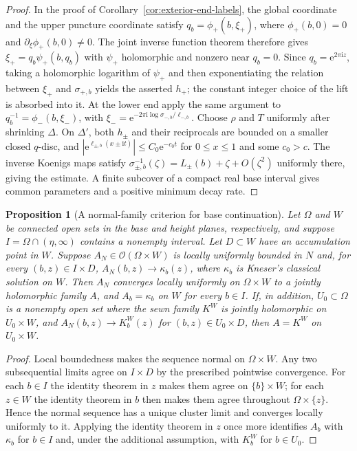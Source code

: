 \documentclass[11pt]{amsart}
\newtheorem{proposition}[theorem]{Proposition}
\theoremstyle{definition}
\newcommand{\Kk}{K}
\newcommand{\eee}{\mathrm{e}}
\newcommand{\ii}{\mathrm{i}}
\begin{document}
\begin{proof}
In the proof of Corollary~\ref{cor:exterior-end-labels}, the global
coordinate and the upper puncture coordinate satisfy
$q_b=\phi_+(b,\xi_+)$, where $\phi_+(b,0)=0$ and
$\partial_{\xi}\phi_+(b,0)\ne0$.  The joint inverse function theorem
therefore gives $\xi_+=q_b\psi_+(b,q_b)$ with $\psi_+$ holomorphic and
nonzero near $q_b=0$.  Since $q_b=\eee^{2\pi\ii z}$, taking a
holomorphic logarithm of $\psi_+$ and then exponentiating the relation
between $\xi_+$ and $\sigma_{+,b}$ yields the asserted $h_+$; the
constant integer choice of the lift is absorbed into it.  At the
lower end apply the same argument to
$q_b^{-1}=\phi_-(b,\xi_-)$, with
$\xi_-=\eee^{-2\pi\ii\log\sigma_{-,b}/\ell_{-,b}}$.
Choose $\rho$ and $T$ uniformly after shrinking $\Delta$.  On
$\Delta'$, both $h_\pm$ and their reciprocals are bounded on a
smaller closed $q$-disc, and
$|\eee^{\ell_{\pm,b}(x\pm\ii t)}|\le C_0\eee^{-c_0t}$
for $0\le x\le1$ and some $c_0>c$.  The inverse Koenigs maps satisfy
$\sigma_{\pm,b}^{-1}(\zeta)=L_\pm(b)+\zeta+O(\zeta^2)$ uniformly
there, giving the estimate.  A finite subcover of a compact real base
interval gives common parameters and a positive minimum decay rate.
\end{proof}

\begin{proposition}[A normal-family criterion for base continuation]
\label{prop:approx-continuation}
Let $\Omega$ and $W$ be connected open sets in the base and height planes,
respectively, and suppose $I=\Omega\cap(\eta,\infty)$ contains a nonempty
interval.  Let $D\subset W$ have an accumulation point in $W$.
Suppose $A_N\in\mathcal O(\Omega\times W)$ is locally uniformly bounded
in $N$ and, for every $(b,z)\in I\times D$,
$A_N(b,z)\to\kappa_b(z)$, where $\kappa_b$ is Kneser's classical solution
on $W$.  Then $A_N$ converges locally uniformly on $\Omega\times W$
to a jointly holomorphic family $A$, and $A_b=\kappa_b$ on $W$ for every
$b\in I$.  If, in addition, $U_0\subset\Omega$ is a nonempty open set
where the sewn family $\Kk^W$ is jointly holomorphic on $U_0\times W$,
and $A_N(b,z)\to\Kk_b^W(z)$ for $(b,z)\in U_0\times D$, then
$A=\Kk^W$ on $U_0\times W$.
\end{proposition}

\begin{proof}
Local boundedness makes the sequence normal on $\Omega\times W$.
Any two subsequential limits agree on $I\times D$ by the prescribed
pointwise convergence.  For each $b\in I$ the identity theorem in $z$
makes them agree on $\{b\}\times W$; for each $z\in W$ the identity
theorem in $b$ then makes them agree throughout $\Omega\times\{z\}$.
Hence the normal sequence has a unique cluster limit and converges
locally uniformly to it.  Applying the identity theorem in $z$ once
more identifies $A_b$ with $\kappa_b$ for $b\in I$ and, under the
additional assumption, with $\Kk_b^W$ for $b\in U_0$.
\end{proof}
\end{document}
